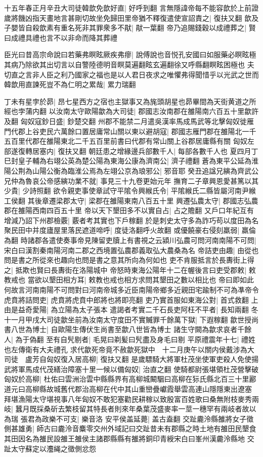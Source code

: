 十五年春正月辛丑大司徒韓歆免歆好直|{
	好呼到翻}
言無隱諱帝每不能容歆於上前證歲將饑凶指天畫地言甚剛切故坐免歸田里帝猶不釋復遣使宣詔責之|{
	復扶又翻}
歆及子嬰皆自殺歆素有重名死非其罪衆多不猒|{
	猒一葉翻}
帝乃追賜錢穀以成禮葬之|{
	賢曰成禮具禮也言不以非命而降其葬禮}


臣光曰昔高宗命說曰若藥弗瞑眩厥疾弗瘳|{
	說傅說也音悦孔安國曰如服藥必瞑眩極其病乃除欲其出切言以自警陸德明音瞑莫遍翻眩玄遍翻徐又呼縣翻瞑眩困極也}
夫切直之言非人臣之利乃國家之福也是以人君日夜求之唯懼弗得聞惜乎以光武之世而韓歆用直諫死豈不為仁明之累哉|{
	累力瑞翻}


丁未有星孛於昴|{
	昂七星西方之宿也主獄事又為旄頭胡星也昴畢間為天街黄道之所經也孛蒲内翻}
以汝南太守歐陽歙為大司徒|{
	郡國志汝南郡在雒陽南六百五十里歙許及翻}
匈奴寇鈔日盛|{
	鈔楚交翻}
州郡不能禁二月遣吳漢率馬成馬武等北擊匈奴徙雁門代郡上谷吏民六萬餘口置居庸常山關以東以避胡寇|{
	郡國志雁門郡在雒陽北一千五百里代郡在雒陽東北二千五百里前書曰代郡有常山關上谷郡居庸縣有關}
匈奴左部遂復轉居塞内|{
	復扶又翻}
朝廷患之增緣邊兵部數千人|{
	每部各數千人也}
夏四月丁巳封皇子輔為右翊公英為楚公陽為東海公康為濟南公|{
	濟子禮翻}
蒼為東平公延為淮陽公荆為山陽公衡為臨淮公焉為左翊公京為琅邪公|{
	邪音耶}
癸丑追諡兄縯為齊武公兄仲為魯哀公帝感縯功業不就|{
	事見三十九卷更始元年}
撫育二子章興恩愛甚篤以其少貴|{
	少詩照翻}
欲令親吏事使章試守平隂令興緱氏令|{
	平隂緱氏二縣皆屬河南尹緱工侯翻}
其後章遷梁郡太守|{
	梁郡在雒陽東南八百五十里}
興遷弘農太守|{
	郡國志弘農郡在雒陽西南四百五十里}
帝以天下墾田多不以實自占|{
	占之贍翻}
又戶口年紀互有增減乃詔下州郡檢覈|{
	覈者考其實也下戶稼翻}
於是刺史太守多為詐巧苟以度田為名聚民田中并度廬屋里落民遮道啼呼|{
	度徒洛翻呼火故翻}
或優饒豪右侵刻羸弱|{
	羸倫為翻}
時諸郡各遣使奏事帝見陳留吏牘上有書視之云潁川弘農可問河南南陽不可問|{
	宋白曰漢割秦南陽河南二郡之西境置弘農郡義取弘大農桑為名}
帝詰吏由趣|{
	由從也問是書之所從來也趣向也問是書之意其所向為何如也}
吏不肯服抵言於長夀街上得之|{
	抵欺也賢曰長夀街在洛陽城中}
帝怒時東海公陽年十二在幄後言曰吏受郡敕|{
	敕教戒也}
當欲以墾田相方耳|{
	敕教也戒也相方求問其墾田之數以相比也}
帝曰即如此何故言河南南陽不可問對曰河南帝城多近臣南陽帝鄉多近親田宅踰制不可為凖帝令虎賁將詰問吏|{
	虎賁將虎賁中郎將也將即亮翻}
吏乃實首服如東海公對|{
	首式救翻}
上由是益奇愛陽|{
	為立陽為太子張本}
遣謁者考實二千石長吏阿枉不平者|{
	長知兩翻}
冬十一月甲戌大司徒歙坐前為汝南太守度田不實贓罪千餘萬下獄|{
	下遐稼翻}
歙世授尚書八世為博士|{
	自歐陽生傳伏生尚書至歙八世皆為博士}
諸生守闕為歙求哀者千餘人|{
	為于偽翻}
至有自髠剔者|{
	毛晃曰剃髪曰髠盡及身毛曰剔}
平原禮震年十七|{
	禮姓也左傳衛有大夫禮孔}
求代歙死帝竟不赦歙死獄中　十二月庚午以關内侯戴涉為大司徒　盧芳自匈奴復入居高柳|{
	復扶又翻}
是歲驃騎大將軍杜茂坐使軍吏殺人免使揚武將軍馬成代茂繕治障塞十里一候以備匈奴|{
	治直之翻}
使騎都尉張堪領杜茂營擊破匈奴於高柳|{
	杜佑曰雲洲治雲中縣縣界有高柳城闞駰曰高柳在狋氏縣北百三十里酈道元曰高柳縣故城舊代郡治高柳在代中其山重巒疊巘霞舉雲高連山隱隱東出遼塞}
拜堪漁陽太守堪視事八年匈奴不敢犯塞勸民耕稼以致殷富百姓歌曰桑無附枝麥秀兩岐|{
	蠶月既採桑斫去繁枝留其特長者則來年桑葉茂盛麥率一莖一穗罕有兩岐者故以為瑞}
張君為政樂不可支|{
	樂音洛}
安平侯盖延薨|{
	盖古盍翻}
交趾麊泠縣雒將女子徵側甚雄勇|{
	師古曰麊泠音麋零交州外域記曰交趾昔未有郡縣之時土地有雒田民墾食其田因名為雒民設雒王雒侯主諸郡縣縣有雒將銅印青綬宋白曰峯州漢麊泠縣地}
交趾太守蘇定以灋䋲之徵側忿怨

